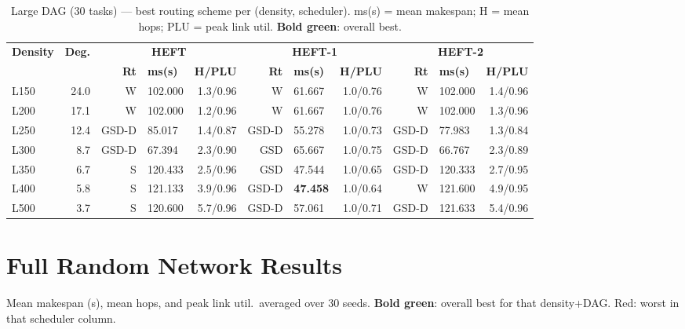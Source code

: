 \documentclass[11pt]{article}
\newcommand{\win}[1]{\textcolor{green!50!black}{\textbf{#1}}}
\newcommand{\bad}[1]{\textcolor{red!70!black}{#1}}
\begin{document}
\begin{table}[H]
\centering\small
\begin{tabular}{l r r@{\,}l@{\,}r r@{\,}l@{\,}r r@{\,}l@{\,}r}
\toprule
\textbf{Density} & \textbf{Deg.} & \multicolumn{3}{c}{\textbf{HEFT}} & \multicolumn{3}{c}{\textbf{HEFT-1}} & \multicolumn{3}{c}{\textbf{HEFT-2}} \\
\cmidrule(lr){3-5}\cmidrule(lr){6-8}\cmidrule(lr){9-11}
& & \textbf{Rt} & \textbf{ms(s)} & \textbf{H/PLU} & \textbf{Rt} & \textbf{ms(s)} & \textbf{H/PLU} & \textbf{Rt} & \textbf{ms(s)} & \textbf{H/PLU} \\
\midrule
  L150 & 24.0 & W & 102.000 & 1.3/0.96 & W & 61.667 & 1.0/0.76 & W & 102.000 & 1.4/0.96 \\
  L200 & 17.1 & W & 102.000 & 1.2/0.96 & W & 61.667 & 1.0/0.76 & W & 102.000 & 1.3/0.96 \\
  L250 & 12.4 & GSD-D & 85.017 & 1.4/0.87 & GSD-D & 55.278 & 1.0/0.73 & GSD-D & 77.983 & 1.3/0.84 \\
  L300 & 8.7 & GSD-D & 67.394 & 2.3/0.90 & GSD & 65.667 & 1.0/0.75 & GSD-D & 66.767 & 2.3/0.89 \\
  L350 & 6.7 & S & 120.433 & 2.5/0.96 & GSD & 47.544 & 1.0/0.65 & GSD-D & 120.333 & 2.7/0.95 \\
  L400 & 5.8 & S & 121.133 & 3.9/0.96 & GSD-D & \win{47.458} & 1.0/0.64 & W & 121.600 & 4.9/0.95 \\
  L500 & 3.7 & S & 120.600 & 5.7/0.96 & GSD-D & 57.061 & 1.0/0.71 & GSD-D & 121.633 & 5.4/0.96 \\
\bottomrule
\end{tabular}
\caption{Large DAG (30 tasks) --- best routing scheme per (density, scheduler). ms(s) = mean makespan; H = mean hops; PLU = peak link util. \win{Bold green}: overall best.}
\end{table}

\section{Full Random Network Results}

Mean makespan (s), mean hops, and peak link util.\ averaged over 30 seeds. \win{Bold green}: overall best for that density+DAG. \bad{Red}: worst in that scheduler column.
\end{document}
